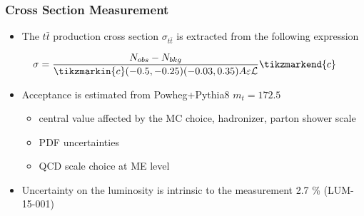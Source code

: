 \documentclass{beamer}
\begin{document}
\begin{frame}
\frametitle{Cross Section Measurement}
\begin{itemize}
\item The $t\bar{t}$ production cross section $\sigma_{t\bar{t}}$ is extracted from the following expression
\end{itemize}
\begin{equation}\label{e:barwq3}\begin{split}
\sigma=
\frac{N_{obs}-N_{bkg}}{\tikzmarkin{c}(-0.5,-0.25)(-0.03,0.35)A\varepsilon \mathcal{L}}\tikzmarkend{c}\nonumber
\tikz[remember picture] \node[coordinate] (n1) {};
\end{split}\end{equation}

\begin{itemize}
\item Acceptance is estimated from Powheg+Pythia8 $m_t=172.5$ 
\begin{itemize}
\item central value affected by the MC choice, hadronizer, parton shower scale
\item PDF uncertainties 
\item QCD scale choice at ME level
\end{itemize}
\item Uncertainty on the luminosity is intrinsic to the measurement 2.7 \%
(LUM-15-001)
\end{itemize}
\end{frame}
\end{document}
